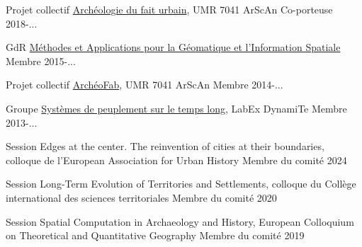 \begin{cvhonors}
  \cvhonor
    {Projet collectif \href{https://faiturbain.hypotheses.org/}{Archéologie du fait urbain}, UMR 7041 ArScAn} %
    {Co-porteuse} %
    {} %
    {2018-...} %

  \cvhonor
    {GdR \href{https://gdr-magis.imag.fr/}{Méthodes et Applications pour la Géomatique et l’Information Spatiale}} %
    {Membre} %
    {} %
    {2015-...} %

  \cvhonor
    {Projet collectif \href{https://abp.hypotheses.org/}{ArchéoFab}, UMR 7041 ArScAn} %
    {Membre} %
    {} %
    {2014-...} %

  \cvhonor
    {Groupe \href{http://labex-dynamite.com/fr/recherches/enjeux-scientifiques-groupes-travail/systemes-de-peuplement-sur-le-temps-long/}{Systèmes de peuplement sur le temps long}, LabEx DynamiTe} %
    {Membre} %
    {} %
    {2013-...} %

\end{cvhonors}

\begin{cvhonors}
  \cvhonor
    {Session Edges at the center. The reinvention of cities at their boundaries, colloque de l'European Association for Urban History} %
    {Membre du comité} %
    {} %
    {2024} %
    
  \cvhonor
    {Session Long-Term Evolution of Territories and Settlements, colloque du Collège international des sciences territoriales} %
    {Membre du comité} %
    {} %
    {2020} %

  \cvhonor
    {Session Spatial Computation in Archaeology and History, European Colloquium on Theoretical and Quantitative Geography} %
    {Membre du comité} %
    {} %
    {2019} %

\end{cvhonors}


